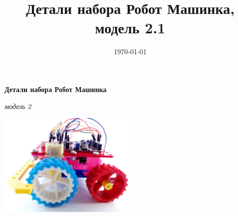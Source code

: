 \documentclass[twoside,a5paper,8pt]{article}
\title{Детали набора Робот Машинка, модель 2.1} %
\date{\today} %
\begin{document}
  \begin{center}
    \textbf{Детали набора Робот Машинка}
  \end{center}
  \begin{flushright}
    \emph{модель 2}
  \end{flushright}
   
  \begin{flushright}
    \includegraphics[height=50mm]{fig/robotcar-sideview.jpg}   
  \end{flushright}
  
   
\end{document}
